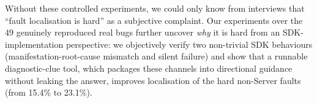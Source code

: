 Without these controlled experiments, we could only know from interviews that
``fault localisation is hard'' as a subjective complaint. Our experiments over the 49 genuinely
reproduced real bugs further uncover \emph{why} it is hard from an SDK-implementation perspective:
we objectively verify two non-trivial SDK behaviours (manifestation-root-cause mismatch and silent
failure) and show that a runnable diagnostic-clue tool, which packages these channels into
directional guidance without leaking the answer, improves localisation of the hard non-Server
faults (from 15.4\% to 23.1\%).